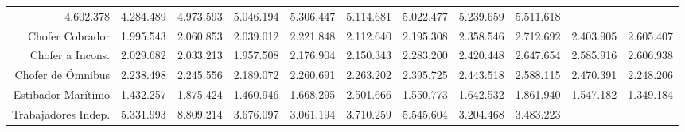 \begin{tabular}{lllllllllll}
  \multicolumn{1}{r}{4.602.378} &
  \multicolumn{1}{r}{4.284.489} &
  \multicolumn{1}{r}{4.973.593} &
  \multicolumn{1}{r}{5.046.194} &
  \multicolumn{1}{r}{5.306.447} &
  \multicolumn{1}{r}{5.114.681} &
  \multicolumn{1}{r}{5.022.477} &
  \multicolumn{1}{r}{5.239.659} &
  \multicolumn{1}{r}{5.511.618} \\
\multicolumn{1}{r}{Chofer Cobrador\hspace{1em}} &
  \multicolumn{1}{|r}{1.995.543} &
  \multicolumn{1}{r}{2.060.853} &
  \multicolumn{1}{r}{2.039.012} &
  \multicolumn{1}{r}{2.221.848} &
  \multicolumn{1}{r}{2.112.640} &
  \multicolumn{1}{r}{2.195.308} &
  \multicolumn{1}{r}{2.358.546} &
  \multicolumn{1}{r}{2.712.692} &
  \multicolumn{1}{r}{2.403.905} &
  \multicolumn{1}{r}{2.605.407} \\
\multicolumn{1}{r}{Chofer a Incons.\hspace{1em}} &
  \multicolumn{1}{|r}{2.029.682} &
  \multicolumn{1}{r}{2.033.213} &
  \multicolumn{1}{r}{1.957.508} &
  \multicolumn{1}{r}{2.176.904} &
  \multicolumn{1}{r}{2.150.343} &
  \multicolumn{1}{r}{2.283.200} &
  \multicolumn{1}{r}{2.420.448} &
  \multicolumn{1}{r}{2.647.654} &
  \multicolumn{1}{r}{2.585.916} &
  \multicolumn{1}{r}{2.606.938} \\
\multicolumn{1}{r}{Chofer de Ómnibus\hspace{1em}} &
  \multicolumn{1}{|r}{2.238.498} &
  \multicolumn{1}{r}{2.245.556} &
  \multicolumn{1}{r}{2.189.072} &
  \multicolumn{1}{r}{2.260.691} &
  \multicolumn{1}{r}{2.263.202} &
  \multicolumn{1}{r}{2.395.725} &
  \multicolumn{1}{r}{2.443.518} &
  \multicolumn{1}{r}{2.588.115} &
  \multicolumn{1}{r}{2.470.391} &
  \multicolumn{1}{r}{2.248.206} \\
\multicolumn{1}{r}{Estibador Marítimo\hspace{1em}} &
  \multicolumn{1}{|r}{1.432.257} &
  \multicolumn{1}{r}{1.875.424} &
  \multicolumn{1}{r}{1.460.946} &
  \multicolumn{1}{r}{1.668.295} &
  \multicolumn{1}{r}{2.501.666} &
  \multicolumn{1}{r}{1.550.773} &
  \multicolumn{1}{r}{1.642.532} &
  \multicolumn{1}{r}{1.861.940} &
  \multicolumn{1}{r}{1.547.182} &
  \multicolumn{1}{r}{1.349.184} \\
\multicolumn{1}{r}{Trabajadores Indep.\hspace{1em}} &
  \multicolumn{1}{|r}{5.331.993} &
  \multicolumn{1}{r}{8.809.214} &
  \multicolumn{1}{r}{3.676.097} &
  \multicolumn{1}{r}{3.061.194} &
  \multicolumn{1}{r}{3.710.259} &
  \multicolumn{1}{r}{5.545.604} &
  \multicolumn{1}{r}{3.204.468} &
  \multicolumn{1}{r}{3.483.223} &

\end{tabular}
